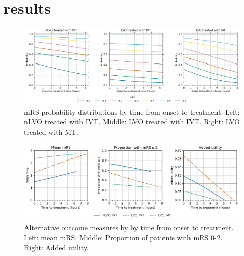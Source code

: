 \section{results}


\begin{figure}
\centering
\includegraphics[width=1.0\textwidth]{./images/probs_with_time}
\caption{mRS probability distributions by time from onset to treatment. Left: nLVO treated with IVT. Middle: LVO treated with IVT. Right: LVO treated with MT.}
\label{fig:probs_with_time}
\end{figure}


\begin{figure}
\centering
\includegraphics[width=1.0\textwidth]{./images/time_to_treatment}
\caption{Alternative outcome measures by by time from onset to treatment. Left: mean mRS. Middle: Proportion of patients with mRS 0-2. Right: Added utility.}
\label{fig:added_utility_six_in_one}
\end{figure}


